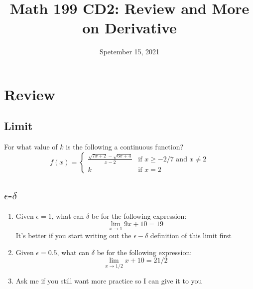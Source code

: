 \documentclass{article}
\title{Math 199 CD2: Review and More on Derivative}
\date{Spetember 15, 2021}
\begin{document}
\maketitle

\section{Review}
\subsection{Limit}

 For what value of $k$ is the following a continuous function?\\
	$$f(x)=\begin{cases}
		\frac{\sqrt{7x+2}-\sqrt{6x+4}}{x-2} & \text{if \ $x \geq -2/7$\ and \ $x\neq 2$} \\
		k & \text{if \ $x=2$}
	\end{cases}$$
\vskip 5cm
\subsection{$\epsilon$-$\delta$}
\begin{enumerate}
	\item Given $\epsilon=1$, what can $\delta$ be for the following expression: 
	$$\lim_{x \to 1} 9x+10=19$$
	It's better if you start writing out the $\epsilon-\delta$ definition of this limit first
	\vskip 5cm
	
	\item Given $\epsilon=0.5$, what can $\delta$ be for the following expression: 
	$$\lim_{x \to 1/2} x+10=21/2$$
	\item Ask me if you still want more practice so I can give it to you
\end{enumerate}
\end{document}
